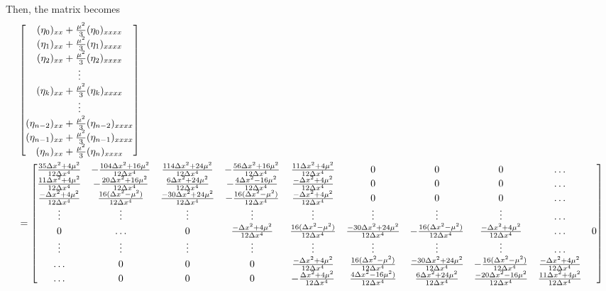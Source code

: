 \documentclass[10pt,reqno,oneside,a4paper, landscape]{article}
\begin{document}
Then, the matrix becomes
\begin{align*}
&\begin{bmatrix}
(\eta_0)_{xx} + \frac{\mu^2}{3} (\eta_0)_{xxxx} \\
(\eta_1)_{xx} + \frac{\mu^2}{3} (\eta_1)_{xxxx} \\
(\eta_2)_{xx} + \frac{\mu^2}{3} (\eta_2)_{xxxx} \\
\vdots \\
(\eta_k)_{xx} + \frac{\mu^2}{3} (\eta_k)_{xxxx} \\
\vdots \\
(\eta_{n-2})_{xx} + \frac{\mu^2}{3} (\eta_{n-2})_{xxxx} \\
(\eta_{n-1})_{xx} + \frac{\mu^2}{3} (\eta_{n-1})_{xxxx} \\
(\eta_{n})_{xx} + \frac{\mu^2}{3} (\eta_{n})_{xxxx}
\end{bmatrix} \\
&=
\begin{bmatrix}
\frac{35\Delta x^2 + 4 \mu^2}{12\Delta x^4} & - \frac{104 \Delta x^2 + 16\mu^2}{12\Delta x^4} & \frac{114 \Delta x^2 + 24 \mu^2}{12\Delta x^4} & - \frac{56 \Delta x^2 + 16\mu^2}{12\Delta x^4} & \frac{11 \Delta x^2 + 4\mu^2}{12\Delta x^4} & 0 & 0 & 0 & \ldots \\
\frac{11\Delta x^2 + 4 \mu^2}{12\Delta x^4} & - \frac{20 \Delta x^2 + 16\mu^2}{12\Delta x^4} & \frac{6 \Delta x^2 + 24 \mu^2}{12\Delta x^4} & - \frac{4 \Delta x^2 - 16\mu^2}{12\Delta x^4} & \frac{- \Delta x^2 + 4\mu^2}{12\Delta x^4} & 0 & 0 & 0 & \ldots\\
\frac{-\Delta x^2 + 4 \mu^2}{12\Delta x^4} & \frac{16 (\Delta x^2 -\mu^2)}{12\Delta x^4} & \frac{-30\Delta x^2 + 24 \mu^2}{12\Delta x^4} & - \frac{16(\Delta x^2 - \mu^2)}{12\Delta x^4} & \frac{- \Delta x^2 + 4\mu^2}{12\Delta x^4} & 0 & 0 & 0 & \ldots \\
\vdots & \vdots & \vdots & \vdots & \vdots & \vdots &\vdots & \vdots & \ldots \\
0 & \ldots & 0 & \frac{-\Delta x^2 + 4 \mu^2}{12\Delta x^4} & \frac{16 (\Delta x^2 -\mu^2)}{12\Delta x^4} & \frac{-30\Delta x^2 + 24 \mu^2}{12\Delta x^4} & - \frac{16(\Delta x^2 - \mu^2)}{12\Delta x^4} & \frac{- \Delta x^2 + 4\mu^2}{12\Delta x^4} & \ldots & 0 \\
\vdots & \vdots & \vdots & \vdots & \vdots & \vdots &\vdots & \vdots & \ldots \\
\ldots & 0 & 0 & 0 & \frac{-\Delta x^2 + 4 \mu^2}{12\Delta x^4} & \frac{16 (\Delta x^2 -\mu^2)}{12\Delta x^4} & \frac{-30\Delta x^2 + 24 \mu^2}{12\Delta x^4} & - \frac{16(\Delta x^2 - \mu^2)}{12\Delta x^4} & \frac{- \Delta x^2 + 4\mu^2}{12\Delta x^4}  \\
\ldots & 0 & 0 & 0 & -\frac{\Delta x^2 + 4 \mu^2}{12\Delta x^4} & \frac{4 \Delta x^2 -16\mu^2)}{12\Delta x^4} & \frac{6\Delta x^2 + 24 \mu^2}{12\Delta x^4} & \frac{-20\Delta x^2 -16 \mu^2}{12\Delta x^4} & \frac{11 \Delta x^2 + 4\mu^2}{12\Delta x^4} \\

\end{bmatrix}
\end{align*}
\end{document}
